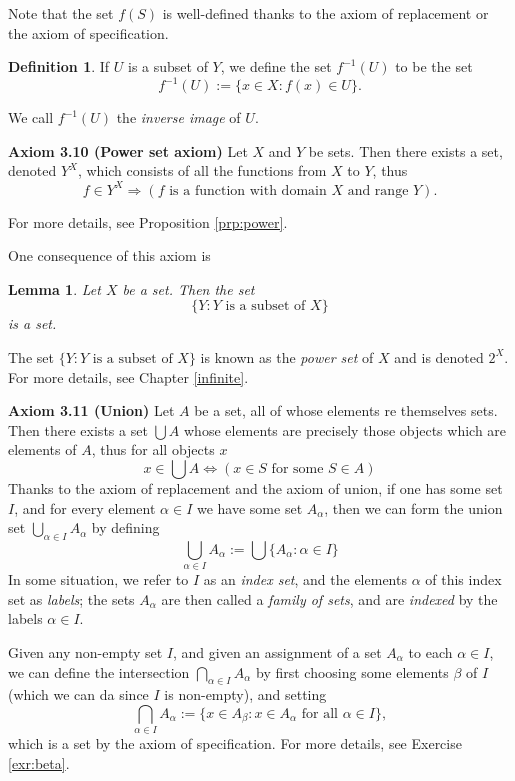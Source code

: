 \documentclass[
]{book}
\newtheorem{lemma}{Lemma}[chapter]
\theoremstyle{definition}
\newtheorem{definition}{Definition}[chapter]
\theoremstyle{definition}
\theoremstyle{definition}
\theoremstyle{definition}
\theoremstyle{remark}
\begin{document}
Note that the set \(f(S)\) is well-defined thanks to the axiom of replacement or the axiom of specification.

\begin{definition}
If \(U\) is a subset of \(Y\), we define the set \(f^{-1}(U)\) to be the set
\[
f^{-1}(U):=\{x\in X: f(x) \in U\}.
\]
\end{definition}

We call \(f^{-1}(U)\) the \emph{inverse image} of \(U\).

\textbf{Axiom 3.10 (Power set axiom)} Let \(X\) and \(Y\) be sets. Then there exists a set, denoted \(Y^X\), which consists of all the functions from \(X\) to \(Y\), thus
\[
f\in Y^X \Longrightarrow (f\text{ is a function with domain }X\text{ and range }Y).
\]

For more details, see Proposition \ref{prp:power}.

One consequence of this axiom is

\begin{lemma}
Let \(X\) be a set. Then the set
\[
\{Y: Y \text{ is a subset of } X\}
\]
is a set.
\end{lemma}

The set \(\{Y: Y \text{ is a subset of } X\}\) is known as the \emph{power set} of \(X\) and is denoted \(2^X\). For more details, see Chapter \ref{infinite}.

\textbf{Axiom 3.11 (Union)} Let \(A\) be a set, all of whose elements re themselves sets. Then there exists a set \(\bigcup A\) whose elements are precisely those objects which are elements of \(A\), thus for all objects \(x\)
\[
x\in \bigcup A \iff (x\in S \text{ for some }S\in A)
\]
Thanks to the axiom of replacement and the axiom of union, if one has some set \(I\), and for every element \(\alpha \in I\) we have some set \(A_{\alpha}\), then we can form the union set \(\bigcup_{\alpha\in I}A_{\alpha}\) by defining
\[
\bigcup_{\alpha\in I}A_{\alpha}:=\bigcup \{A_{\alpha}:\alpha\in I\}
\]
In some situation, we refer to \(I\) as an \emph{index set}, and the elements \(\alpha\) of this index set as \emph{labels}; the sets \(A_{\alpha}\) are then called a \emph{family of sets}, and are \emph{indexed} by the labels \(\alpha\in I\).

Given any non-empty set \(I\), and given an assignment of a set \(A_{\alpha}\) to each \(\alpha\in I\), we can define the intersection \(\bigcap_{\alpha\in I}A_{\alpha}\) by first choosing some elements \(\beta\) of \(I\) (which we can da since \(I\) is non-empty), and setting
\[
\bigcap_{\alpha\in I}A_{\alpha}:=\{x\in A_{\beta}: x\in A_{\alpha} \text{ for all }\alpha \in I\},
\]
which is a set by the axiom of specification. For more details, see Exercise \ref{exr:beta}.
\end{document}
